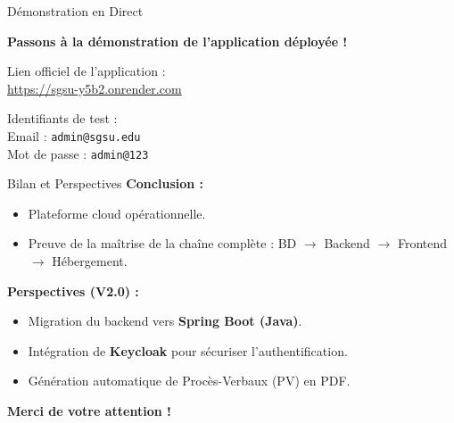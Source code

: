 \documentclass{beamer}
\begin{document}
\begin{frame}{Démonstration en Direct}
    \begin{center}
        \Large \textbf{Passons à la démonstration de l'application déployée !}
        
        \vspace{1cm}
        \normalsize Lien officiel de l'application :\\
        \url{https://sgsu-y5b2.onrender.com}
        
        \vspace{1cm}
        \normalsize Identifiants de test :\\
        Email : \texttt{admin@sgsu.edu}\\
        Mot de passe : \texttt{admin@123}
    \end{center}
\end{frame}

\begin{frame}{Bilan et Perspectives}
    \textbf{Conclusion :}
    \begin{itemize}
        \item Plateforme cloud opérationnelle.
        \item Preuve de la maîtrise de la chaîne complète : BD $\rightarrow$ Backend $\rightarrow$ Frontend $\rightarrow$ Hébergement.
    \end{itemize}
    
    \vspace{0.5cm}
    \textbf{Perspectives (V2.0) :}
    \begin{itemize}
        \item Migration du backend vers \textbf{Spring Boot (Java)}.
        \item Intégration de \textbf{Keycloak} pour sécuriser l'authentification.
        \item Génération automatique de Procès-Verbaux (PV) en PDF.
    \end{itemize}
\end{frame}

\begin{frame}
    \begin{center}
        \Huge \textbf{Merci de votre attention !}
    \end{center}
\end{frame}
\end{document}
